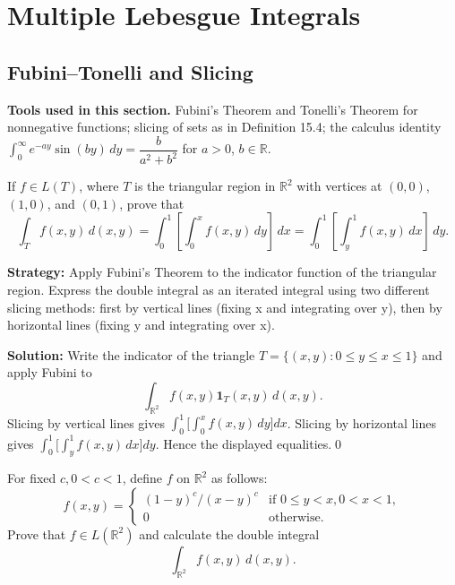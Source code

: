 \chapter{Multiple Lebesgue Integrals}


\section{Fubini--Tonelli and Slicing}
\noindent\textbf{Tools used in this section.} Fubini's Theorem and Tonelli's Theorem for nonnegative functions; slicing of sets as in Definition 15.4; the calculus identity \(\int_0^{\infty} e^{-ay} \sin(by) \, dy = \dfrac{b}{a^2 + b^2}\) for \(a>0\), \(b\in\mathbb{R}\).
 


\begin{problembox}
If \( f \in L(T) \), where \( T \) is the triangular region in \( \mathbb{R}^2 \) with vertices at \((0, 0)\), \((1, 0)\), and \((0, 1)\), prove that
\[
\int_T f(x, y) \, d(x, y) = \int_0^1 \left[ \int_0^x f(x, y) \, dy \right] \, dx = \int_0^1 \left[ \int_y^1 f(x, y) \, dx \right] \, dy.
\]
\end{problembox}

\noindent\textbf{Strategy:} Apply Fubini's Theorem to the indicator function of the triangular region. Express the double integral as an iterated integral using two different slicing methods: first by vertical lines (fixing x and integrating over y), then by horizontal lines (fixing y and integrating over x).

\bigskip\noindent\textbf{Solution:}
Write the indicator of the triangle \(T=\{(x,y): 0\le y \le x \le 1\}\) and apply Fubini to
\[
\int_{\mathbb{R}^2} f(x,y) \mathbf{1}_T(x,y)\, d(x,y).
\]
Slicing by vertical lines gives \(\int_0^1\!\big[\int_0^x f(x,y)\,dy\big]dx\). Slicing by horizontal lines gives \(\int_0^1\!\big[\int_y^1 f(x,y)\,dx\big]dy\). Hence the displayed equalities.\qed


\begin{problembox}
For fixed \( c, 0 < c < 1 \), define \( f \) on \( \mathbb{R}^2 \) as follows:
\[
f(x, y) = 
\begin{cases} 
(1 - y)^c / (x - y)^c & \text{if } 0 \leq y < x, 0 < x < 1, \\
0 & \text{otherwise}.
\end{cases}
\]
Prove that \( f \in L(\mathbb{R}^2) \) and calculate the double integral 
\[
\int_{\mathbb{R}^2} f(x, y) \, d(x, y).
\]
\end{problembox}


